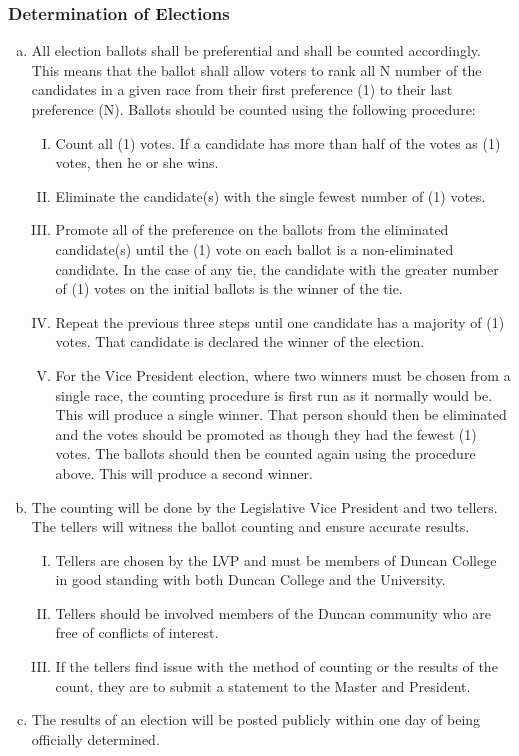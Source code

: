 \documentclass[USletter,12pt]{article}
\begin{document}
\subsubsection{Determination of Elections}
\begin{enumerate}[(a)]
\item All election ballots shall be preferential and shall be counted accordingly.  This means that the ballot shall allow voters to rank all N number of the candidates in a given race from their first preference (1) to their last preference (N).  Ballots should be counted using the following procedure:
	\begin{enumerate}[(I)]
	\item Count all (1) votes.  If a candidate has more than half of the votes as (1) votes, then he or she wins.
	\item Eliminate the candidate(s) with the single fewest number of (1) votes.
	\item Promote all of the preference on the ballots from the eliminated candidate(s) until the (1) vote on each ballot is a non-eliminated candidate.  In the case of any tie, the candidate with the greater number of (1) votes on the initial ballots is the winner of the tie.
	\item Repeat the previous three steps until one candidate has a majority of (1) votes.  That candidate is declared the winner of the election.  
	\item For the Vice President election, where two winners must be chosen from a single race, the counting procedure is first run as it normally would be.  This will produce a single winner.  That person should then be eliminated and the votes should be promoted as though they had the fewest (1) votes.  The ballots should then be counted again using the procedure above.  This will produce a second winner.
	\end{enumerate}
\item The counting will be done by the Legislative Vice President and two tellers.  The tellers will witness the ballot counting and ensure accurate results.
	\begin{enumerate}[(I)]
	\item Tellers are chosen by the LVP and must be members of Duncan College in good standing with both Duncan College and the University.
	\item Tellers should be involved members of the Duncan community who are free of conflicts of interest.
	\item If the tellers find issue with the method of counting or the results of the count, they are to submit a statement to the Master and President.
	\end{enumerate}
\item The results of an election will be posted publicly within one day of being officially determined.
\end{enumerate}
\end{document}
